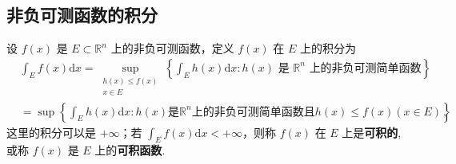 \documentclass[../../main.tex]{subfiles}
\begin{document}
\subsection{非负可测函数的积分}

\begin{definition}
设 \(f(x)\) 是 \(E\subset\mathbb{R}^n\) 上的非负可测函数，定义 \(f(x)\) 在 \(E\) 上的积分为
\begin{align*}
&\int_{E}f(x)\mathrm{d}x=\sup_{\substack{h(x)\leq f(x)\\x\in E}}\left\{\int_{E}h(x)\mathrm{d}x:h(x)\text{ 是 }\mathbb{R}^n\text{ 上的非负可测简单函数}\right\}\\
&=\sup\left\{ \int_E{h\left( x \right) \mathrm{d}x}:h\left( x \right) \text{是}\mathbb{R} ^n\text{上的非负可测简单函数且}h\left( x \right) \leqslant f\left( x \right) \left( x\in E \right) \right\},
\end{align*}
这里的积分可以是 \(+\infty\)；若 \(\int_{E}f(x)\mathrm{d}x< +\infty\)，则称 \(f(x)\) 在 \(E\) 上是\textbf{可积的},或称 \(f(x)\) 是 \(E\) 上的\textbf{可积函数}. 
\end{definition}
\end{document}
